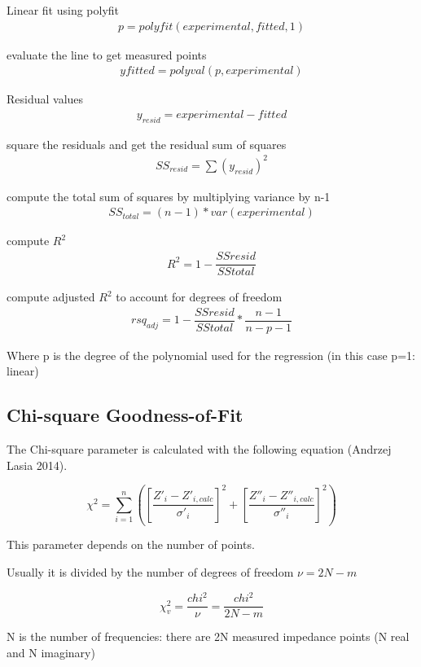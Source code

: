 \documentclass[10pt,b5paper,oneside]{book}
\begin{document}
Linear fit using polyfit
\begin{align}
	p = polyfit(experimental,fitted,1)
\end{align}

evaluate the line to get measured points
\begin{align}
yfitted = polyval(p,experimental)
\end{align}

Residual values
\begin{align}
	y_{resid} = experimental - fitted
\end{align}

square the residuals and get the residual sum of squares
\begin{align}
	SS_{resid} = \sum(y_{resid})^2
\end{align}

compute the total sum of squares by multiplying  variance by n-1
\begin{align}
	SS_{total} = (n-1) * var(experimental)
\end{align}

compute $R^2$
\begin{align}
	R^2 = 1 - \dfrac{SSresid}{SStotal}
\end{align}

compute adjusted $R^2$ to account for degrees of freedom
\begin{align}
	rsq_{adj} = 1 - \dfrac{SSresid}{SStotal} * \dfrac{n-1}{n-p-1}
\end{align}

Where p is the degree of the polynomial used for the regression (in this case p=1: linear)


\subsection{Chi-square Goodness-of-Fit}

The Chi-square parameter is calculated with the following equation (Andrzej Lasia 2014).

\[ \chi^2 = \sum_{i=1}^{n}{\left( \left[ \dfrac{Z'_i - Z'_{i,calc}}{\sigma'_i} \right]^2 + \left[ \dfrac{Z''_i - Z''_{i,calc}}{\sigma''_i} \right]^2 \right)} \]

This parameter depends on the number of points.

Usually it is divided by the number of degrees of freedom $\nu = 2N - m$

\[ \chi^2_v = \dfrac{chi^2}{\nu} = \dfrac{chi^2}{2N - m} \]

N is the number of frequencies: there are 2N measured impedance points (N real and N imaginary)
\end{document}
